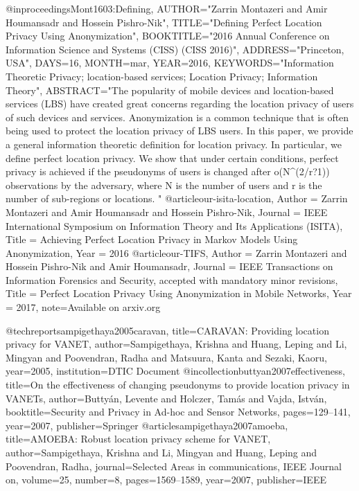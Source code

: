 {{{{{{{{{@inproceedings{Mont1603:Defining,
AUTHOR="Zarrin Montazeri and Amir Houmansadr and Hossein Pishro-Nik",
TITLE="Defining Perfect Location Privacy Using Anonymization",
BOOKTITLE="2016 Annual Conference on Information Science and Systems (CISS) (CISS
2016)",
ADDRESS="Princeton, USA",
DAYS=16,
MONTH=mar,
YEAR=2016,
KEYWORDS="Information Theoretic Privacy; location-based services; Location Privacy;
Information Theory",
ABSTRACT="The popularity of mobile devices and location-based services (LBS) have
created great concerns regarding the location privacy of users of such
devices and services. Anonymization is a common technique that is often
being used to protect the location privacy of LBS users. In this paper, we
provide a general information theoretic definition for location privacy. In
particular, we define perfect location privacy. We show that under certain
conditions, perfect privacy is achieved if the pseudonyms of users is
changed after o(N^(2/r?1)) observations by the adversary, where N is the
number of users and r is the number of sub-regions or locations.
"
}
@article{our-isita-location,
	Author = {Zarrin Montazeri and Amir Houmansadr and Hossein Pishro-Nik},
	Journal = {IEEE International Symposium on Information Theory and Its Applications (ISITA)},
	Title = {Achieving Perfect Location Privacy in Markov Models Using Anonymization},
	Year = {2016}
	}
@article{our-TIFS,
	Author = {Zarrin Montazeri and Hossein Pishro-Nik and Amir Houmansadr},
	Journal = {IEEE Transactions on Information Forensics and Security, accepted with mandatory minor revisions},
	Title = {Perfect Location Privacy Using Anonymization in Mobile Networks},
	Year = {2017},
    note={Available on arxiv.org}
	}



@techreport{sampigethaya2005caravan,
  title={CARAVAN: Providing location privacy for VANET},
  author={Sampigethaya, Krishna and Huang, Leping and Li, Mingyan and Poovendran, Radha and Matsuura, Kanta and Sezaki, Kaoru},
  year={2005},
  institution={DTIC Document}
}
@incollection{buttyan2007effectiveness,
  title={On the effectiveness of changing pseudonyms to provide location privacy in VANETs},
  author={Butty{\'a}n, Levente and Holczer, Tam{\'a}s and Vajda, Istv{\'a}n},
  booktitle={Security and Privacy in Ad-hoc and Sensor Networks},
  pages={129--141},
  year={2007},
  publisher={Springer}
}
@article{sampigethaya2007amoeba,
  title={AMOEBA: Robust location privacy scheme for VANET},
  author={Sampigethaya, Krishna and Li, Mingyan and Huang, Leping and Poovendran, Radha},
  journal={Selected Areas in communications, IEEE Journal on},
  volume={25},
  number={8},
  pages={1569--1589},
  year={2007},
  publisher={IEEE}
}

}}}}}}}}}
